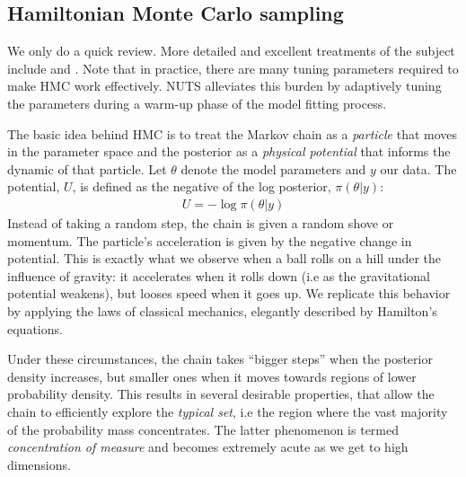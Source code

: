\documentclass[11pt]{article}
\begin{document}
  
  \subsection{Hamiltonian Monte Carlo sampling}
  
  We only do a quick review. More detailed and excellent treatments of the subject 
  include \cite{Radford:2010} and \cite{Betancourt:2017}.
  Note that in practice, there are many tuning parameters required to make HMC work effectively.
  NUTS alleviates this burden by adaptively tuning the parameters during a warm-up phase of the
  model fitting process.
    
  The basic idea behind HMC is to treat the Markov chain as a \textit{particle} that moves in the
  parameter space and the posterior as a \textit{physical potential} that informs the dynamic of
  that particle. Let $\theta$ denote the model parameters and $y$ our data.
  The potential, $U$, is defined as the negative of the log posterior, $\pi(\theta | y)$:
  \begin{eqnarray}
    U = - \log \pi(\theta | y)
  \label{eq:potential}
  \end{eqnarray}
  Instead of taking a random step, the chain is given a random shove or momentum. The
  particle's acceleration is given by the negative change in potential. This is exactly what 
  we observe when a ball rolls on a hill under the influence of gravity: it accelerates when
  it rolls down (i.e as the gravitational potential weakens), but looses speed when it goes
  up. We replicate this behavior by applying the laws of classical mechanics, elegantly 
  described by Hamilton's equations.
  
  Under these circumstances, the chain takes ``bigger steps'' when the posterior density increases, 
  but smaller ones when it moves towards regions of lower probability density. This results in several
  desirable properties, that allow the chain to efficiently explore the \textit{typical set}, i.e the region 
  where the vast majority of the probability mass concentrates.
  The latter phenomenon is termed \textit{concentration of measure} and becomes extremely acute
  as we get to high dimensions.
  
\end{document}
